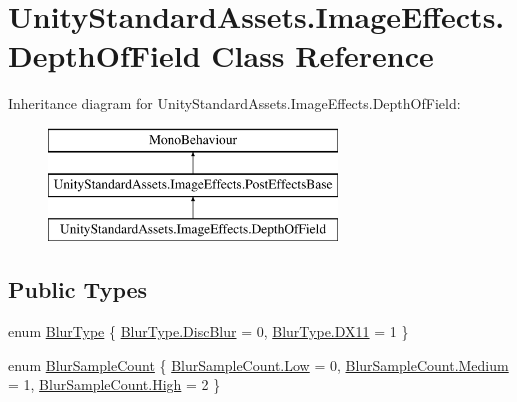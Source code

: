 \hypertarget{class_unity_standard_assets_1_1_image_effects_1_1_depth_of_field}{}\section{Unity\+Standard\+Assets.\+Image\+Effects.\+Depth\+Of\+Field Class Reference}
\label{class_unity_standard_assets_1_1_image_effects_1_1_depth_of_field}
Inheritance diagram for Unity\+Standard\+Assets.\+Image\+Effects.\+Depth\+Of\+Field\+:\begin{figure}[H]
\begin{center}
\leavevmode
\includegraphics[height=3.000000cm]{class_unity_standard_assets_1_1_image_effects_1_1_depth_of_field}
\end{center}
\end{figure}
\subsection*{Public Types}
\begin{DoxyCompactItemize}
\item 
enum \mbox{\hyperlink{class_unity_standard_assets_1_1_image_effects_1_1_depth_of_field_ab7aaacbb098cf0b20da9d9b6e502d7c7}{Blur\+Type}} \{ \mbox{\hyperlink{class_unity_standard_assets_1_1_image_effects_1_1_depth_of_field_ab7aaacbb098cf0b20da9d9b6e502d7c7a26d395bd59cbf7cded165ca9e16d534b}{Blur\+Type.\+Disc\+Blur}} = 0, 
\mbox{\hyperlink{class_unity_standard_assets_1_1_image_effects_1_1_depth_of_field_ab7aaacbb098cf0b20da9d9b6e502d7c7ad57057b1c58cba9d4c5bd4f3ab7ee78e}{Blur\+Type.\+D\+X11}} = 1
 \}
\item 
enum \mbox{\hyperlink{class_unity_standard_assets_1_1_image_effects_1_1_depth_of_field_abd4e71b10ed1bbe087a4f15b735bb77b}{Blur\+Sample\+Count}} \{ \mbox{\hyperlink{class_unity_standard_assets_1_1_image_effects_1_1_depth_of_field_abd4e71b10ed1bbe087a4f15b735bb77ba28d0edd045e05cf5af64e35ae0c4c6ef}{Blur\+Sample\+Count.\+Low}} = 0, 
\mbox{\hyperlink{class_unity_standard_assets_1_1_image_effects_1_1_depth_of_field_abd4e71b10ed1bbe087a4f15b735bb77ba87f8a6ab85c9ced3702b4ea641ad4bb5}{Blur\+Sample\+Count.\+Medium}} = 1, 
\mbox{\hyperlink{class_unity_standard_assets_1_1_image_effects_1_1_depth_of_field_abd4e71b10ed1bbe087a4f15b735bb77ba655d20c1ca69519ca647684edbb2db35}{Blur\+Sample\+Count.\+High}} = 2
 \}
\end{DoxyCompactItemize}
